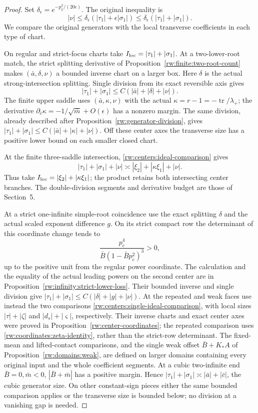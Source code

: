 \begin{proof}
Set $\delta_\epsilon=e^{-p_\sharp^2/(20\epsilon)}$.
The original inequality is
\begin{equation}\label{rw:fibre:transport-start}
 |\nu|\le\delta_\epsilon
                 (|\tau_1|+\epsilon|\sigma_1|)
          \le\delta_\epsilon
                 (|\tau_1|+|\sigma_1|).
\end{equation}
We compare the original generators with the local transverse
coefficients in each type of chart.

On regular and strict-focus charts take
$I_{\rm loc}=|\tau_1|+|\sigma_1|$. At a two-lower-root match,
the strict splitting derivative of
Proposition~\ref{rw:finite:two-root-count} makes
$(\bar a,\delta,\nu)$ a bounded inverse chart on a larger box.
Here $\delta$ is the actual strong-intersection splitting.
Single division from its exact reversible axis gives
\[
 |\tau_1|+|\sigma_1|
                 \le C(|\bar a|+|\delta|+|\nu|).
\]
The finite upper saddle uses $(\bar a,\kappa,\nu)$ with the
actual $\kappa=r-1=-\operatorname{tr}/\lambda_+$; the derivative
$\partial_{\bar c}\kappa=-1/\sqrt{\bar m}+O(\epsilon)$ has a
nonzero margin. The same division, already described after
Proposition~\ref{rw:generator-division}, gives
$|\tau_1|+|\sigma_1|\le C(|\bar a|+|\kappa|+|\nu|)$.
Off these center axes the transverse size has a positive lower
bound on each smaller closed chart.

At the finite three-saddle intersection,
\eqref{rw:centers:ideal-comparison} gives
\[
 |\tau_1|+|\sigma_1|+|\nu|
            \asymp |\xi_2|+|\kappa\xi_1|+|\nu|.
\]
Thus take $I_{\rm loc}=|\xi_2|+|\kappa\xi_1|$; the product
retains both intersecting center branches. The double-division
segments and derivative budget are those of Section~5.

At a strict one-infinite simple-root coincidence use the exact
splitting $\delta$ and the actual scaled exponent difference
$g$. On its strict compact row the determinant of this coordinate
change tends to
\[
 \frac{p_c^4}{\bar B(1-\bar Bp_c^2)^3}>0,
\]
up to the positive unit from the regular power coordinate.
The calculation and the equality of the actual leading powers
on the second center are in
Proposition~\ref{rw:infinity:strict-lower-loss}.
Their bounded inverse and single division give
$|\tau_1|+|\sigma_1|\le C(|\delta|+|g|+|\nu|)$.
At the repeated and weak faces use instead the two comparisons
\eqref{rw:centers:single-ideal-comparison}, with local sizes
$|\tau|+|\zeta|$ and $|d_s|+|\varsigma|$, respectively.
Their inverse charts and exact center axes were proved in
Proposition~\ref{rw:center-coordinates}; the repeated comparison
uses \eqref{rw:coordinates:zeta-identity}, rather than the strict-row
determinant. The fixed-mean and lifted-contact comparisons, and the
single weak offset $\bar B+K_*A$ of
Proposition~\ref{rw:domains:weak}, are defined on larger domains
containing every original input and the whole coefficient segments.
At a cubic two-infinite end $\bar B=0,\bar m<0$,
$|\bar B+\bar m|$ has a positive margin. Hence
$|\tau_1|+|\sigma_1|\asymp|\bar a|+|\bar c|$,
the cubic generator size. On other constant-sign pieces
either the same bounded comparison applies or the
transverse size is bounded below; no division at a vanishing
gap is needed.


\end{proof}
